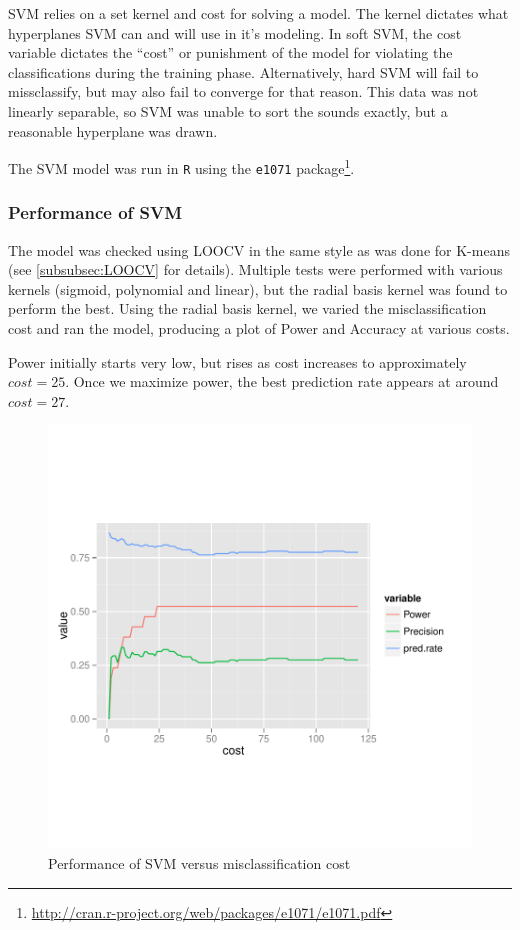 \documentclass[paper=a4, fontsize=11pt]{scrartcl}
\numberwithin{equation}{section}
\numberwithin{figure}{section}
\numberwithin{table}{section}
\begin{document}
\noindent SVM relies on a set kernel and cost for solving a model. The kernel dictates what hyperplanes SVM can and will use in it's modeling. In soft SVM, the cost variable dictates the ``cost'' or punishment of the model for violating the classifications during the training phase. Alternatively, hard SVM will fail to missclassify, but may also fail to converge for that reason. This data was not linearly separable, so SVM was unable to sort the sounds exactly, but a reasonable hyperplane was drawn.

\noindent The SVM model was run in \texttt{R} using the \texttt{e1071} package\footnote{\url{http://cran.r-project.org/web/packages/e1071/e1071.pdf}}.

\subsubsection{Performance of SVM}
The model was checked using LOOCV in the same style as was done for K-means (see \ref{subsubsec:LOOCV} for details). Multiple tests were performed with various kernels (sigmoid, polynomial and linear), but the radial basis kernel was found to perform the best. Using the radial basis kernel, we varied the misclassification cost and ran the model, producing a plot of Power and Accuracy at various costs.

Power initially starts very low, but rises as cost increases to approximately $cost = 25$. Once we maximize power, the best prediction rate appears at around $cost = 27$.

\begin{figure}[H]
\begin{center}
\vspace{-100pt}
\includegraphics[width=\textwidth]{svm_accuracy.pdf}
\vspace{-120pt}
\caption{Performance of SVM versus misclassification cost}
\end{center}
\end{figure}
\end{document}
